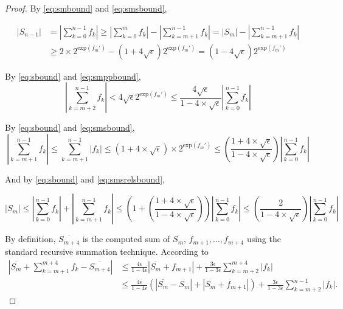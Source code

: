 \documentclass[12pt]{article}
\providecommand{\exp}{\ensuremath{\text{exp}}}
\theoremstyle{definition}
\numberwithin{equation}{section}
\numberwithin{figure}{section}
\begin{document}
\begin{proof}
      By  \eqref{eq:smbound} and \eqref{eq:smsbound},

      \begin{align}
        |S_{n-1}| & = |\sum\limits_{k = 0}^{n - 1} f_k| \geq |\sum\limits_{k = 0}^{m} f_k| - |\sum\limits_{k = m + 1}^{n - 1} f_k| = |S_m| - |\sum\limits_{k = m + 1}^{n - 1} f_k| \nonumber \\
        & \geq 2 \times 2^{\exp(f_{m}')} - (1 + 4 \sqrt\epsilon) 2^{\exp(f_m')} = (1 - 4 \sqrt\epsilon) 2^{\exp(f_m')}
        \label{eq:sbound}
      \end{align}

      By  \eqref{eq:sbound} and \eqref{eq:smppbound},
      \begin{equation}
        |\sum \limits_{k = m + 2}^{n - 1} f_k| < 4 \sqrt{\epsilon} 2^{\exp(f_m')} \leq \frac{4 \sqrt\epsilon}{1 - 4 \times \sqrt\epsilon}|\sum\limits_{k = 0}^{n - 1}f_k|
        \label{eq:smpprelsbound}
      \end{equation}

      By  \eqref{eq:sbound} and \eqref{eq:smsbound},
      \begin{equation}
        |\sum\limits_{k = m + 1}^{n - 1}f_k| \leq \sum\limits_{k = m + 1}^{n - 1}|f_k| \leq (1 + 4 \times \sqrt\epsilon)\times2^{\exp(f_m')}\leq (\frac{1 + 4 \times \sqrt\epsilon}{1 - 4 \times \sqrt\epsilon})|\sum\limits_{k = 0}^{n - 1}f_k|
        \label{eq:smsrelsbound}
      \end{equation}

      And by \eqref{eq:sbound} and \eqref{eq:smsrelsbound},

      \begin{equation}
        |S_m| \leq |\sum\limits_{k = 0}^{n - 1}f_k| + |\sum\limits_{k = m + 1}^{n - 1} f_k| \leq (1 + (\frac{1 + 4 \times \sqrt\epsilon}{1 - 4 \times \sqrt\epsilon}))|\sum\limits_{k = 0}^{n - 1}f_k| \leq (\frac{2}{1 - 4 \times \sqrt\epsilon})|\sum\limits_{k = 0}^{n - 1}f_k|
        \label{eq:smrelsbound}
      \end{equation}

    By definition, $\overline{S_{m+4}}$ is the computed sum of
    $\overline{S_m}$, $f_{m+1}, \ldots, f_{m+4}$ using the standard recursive summation technique.
    According to \cite[Equation 1.2, 2.4]{higham}
    \begin{align*}
        |\overline{S_m} + \sum_{k=m+1}^{m+4}f_k - \overline{S_{m+4}}|
        & \leq \frac{4\epsilon}{1-4\epsilon} |\overline{S_m} + f_{m+1}| + \frac{3\epsilon}{1-3\epsilon} \sum_{k=m+2}^{m+4}|f_k| \\
        & \leq \frac{4\epsilon}{1-4\epsilon} (|\overline{S_m} - S_m| + |S_m + f_{m+1}|)
            + \frac{3\epsilon}{1-3\epsilon} \sum_{k=m+2}^{n-1}|f_k|.
    \end{align*}


\end{proof}
\end{document}
